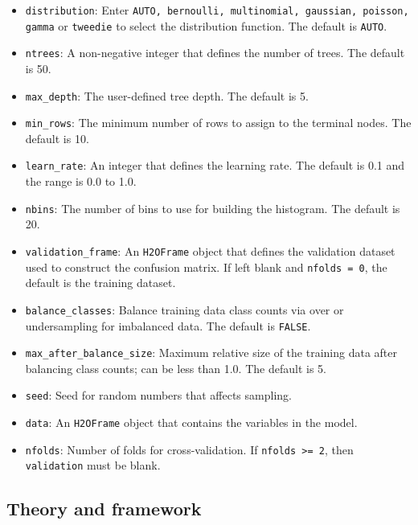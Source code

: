 {\begin{itemize}
\item \texttt{distribution}: Enter {\texttt{AUTO, bernoulli, multinomial, gaussian, poisson, gamma}} or {\texttt{tweedie}} to select the distribution function. The default is {\texttt{AUTO}}. 

\item {\texttt{ntrees}}: A non-negative integer that defines the number of trees. The default is 50. 

\item {\texttt{max\_depth}}: The user-defined tree depth. The default is 5. 

\item {\texttt{min\_rows}}: The minimum number of rows to assign to the terminal nodes. The default is 10. 

\item {\texttt{learn\_rate}}: An integer that defines the learning rate. The default is 0.1 and the range is 0.0 to 1.0. 

\item {\texttt{nbins}}: The number of bins to use for building the histogram. The default is 20. 

\item {\texttt{validation\_frame}}: An {\texttt{H2OFrame}} object that defines the validation dataset used to construct the confusion matrix. If left blank and {\texttt{nfolds = 0}}, the default is the training dataset.

\item {\texttt{balance\_classes}}: Balance training data class counts via over or undersampling for imbalanced data. The default is {\texttt{FALSE}}. 

\item {\texttt{max\_after\_balance\_size}}: Maximum relative size of the training data after balancing class counts; can be less than 1.0.  The default is 5. 

\item {\texttt{seed}}: Seed for random numbers that affects sampling. 

\item {\texttt{data}}: An {\texttt{H2OFrame}} object that contains the variables in the model. 

\item {\texttt{nfolds}}: Number of folds for cross-validation. If {\texttt{nfolds >= 2}}, then {\texttt{validation}} must be blank. 

\end{itemize}

\subsection{Theory and framework} 

}
